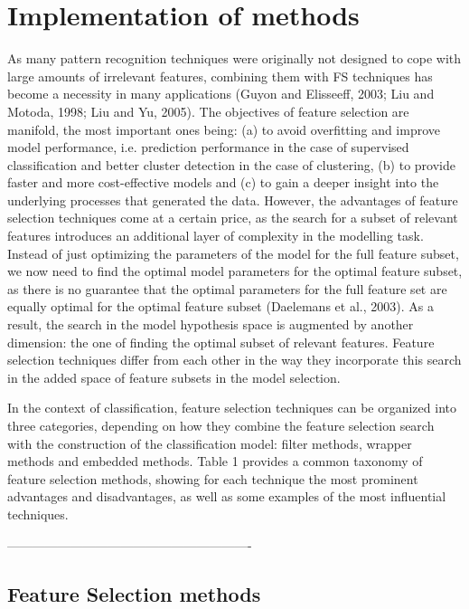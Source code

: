 \chapter{Implementation of methods}
\label{cha:implementation_methods}

As many pattern recognition techniques were originally not designed to cope with large amounts of irrelevant features, combining them with FS techniques has become a necessity in many applications (Guyon and Elisseeff, 2003; Liu and Motoda, 1998; Liu and Yu, 2005). The objectives of feature selection are manifold, the most important ones being: (a) to avoid overfitting and improve model performance, i.e. prediction performance in the case of supervised classification and better cluster detection in the case of clustering, (b) to provide faster and more cost-effective models and (c) to gain a deeper insight into the underlying processes that generated the data. However, the advantages of feature selection techniques come at a certain price, as the search for a subset of relevant features introduces an additional layer of complexity in the modelling task. Instead of just optimizing the parameters of the model for the full feature subset, we now need to find the optimal model parameters for the optimal feature subset, as there is no guarantee that the optimal parameters for the full feature set are equally optimal for the optimal feature subset (Daelemans et al., 2003). As a result, the search in the model hypothesis space is augmented by another dimension: the one of finding the optimal subset of relevant features. Feature selection techniques differ from each other in the way they incorporate this search in the added space of feature subsets in the model selection.

In the context of classification, feature selection techniques can be organized into three categories, depending on how they combine the feature selection search with the construction of the classification model: filter methods, wrapper methods and embedded methods. Table 1 provides a common taxonomy of feature selection methods, showing for each technique the most prominent advantages and disadvantages, as well as some examples of the most influential techniques.


----------------------------------------------------------



\section{Feature Selection methods} %
\label{sec:feature_selection}


